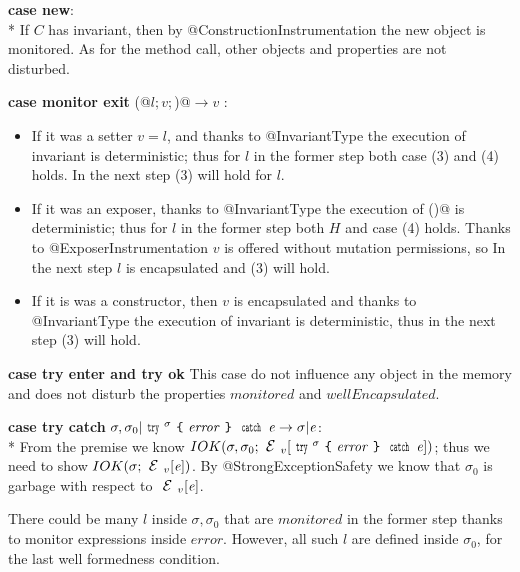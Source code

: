 \noindent\textbf{case new}:\\*
  If $C$ has invariant, then by @ConstructionInstrumentation the new object is monitored.
As for the method call, other objects and properties are not disturbed.


\noindent\textbf{case monitor exit} \Q@M(@$l;v;$\Q@true)@$\rightarrow v$ :
  \begin{itemize}
\item
    If it was a setter $v=l$, and 
    thanks to @InvariantType the execution of invariant is deterministic;
    thus for $l$ in the former step both case (3) and (4) holds.
    In the next step (3) will hold for $l$.
\item
    If it was an exposer, thanks to @InvariantType the execution of \Q@invariant()@ is deterministic;
    thus for $l$ in the former step both $H$ and case (4) holds.
    Thanks to @ExposerInstrumentation $v$ is offered without mutation permissions, so
    In the next step $l$ is encapsulated and (3) will hold.
\item
    If it is was a constructor, 
    then $v$ is encapsulated and thanks to @InvariantType
    the execution of invariant is deterministic, thus in the next step (3) will hold.
\end{itemize}

\noindent\textbf{case try enter and try ok}
This case do not influence any object in the memory and does not
disturb the properties $\mathit{monitored}$ and $\mathit{wellEncapsulated}$.

\noindent\textbf{case try catch} $\sigma,\sigma_0|\Kw{try}^\sigma \oC\mathit{error}\cC\Kw{catch}\, \e\rightarrow \sigma|\e$:\\*
From the premise we know 
$IOK(\sigma,\sigma_0;\ctx_v[\Kw{try}^\sigma \oC\mathit{error}\cC\Kw{catch}\, \e])$;
thus we need to show
$IOK(\sigma;\ctx_v[\e])$.
By @StrongExceptionSafety we know that $\sigma_0$ is garbage with respect to $\ctx_v[\e]$.

There could be many $l$ inside $\sigma,\sigma_0$ that are $\mathit{monitored}$
in the former step thanks to monitor expressions inside $\mathit{error}$.
However, all such $l$ are defined inside $\sigma_0$,
for the last well formedness condition.


